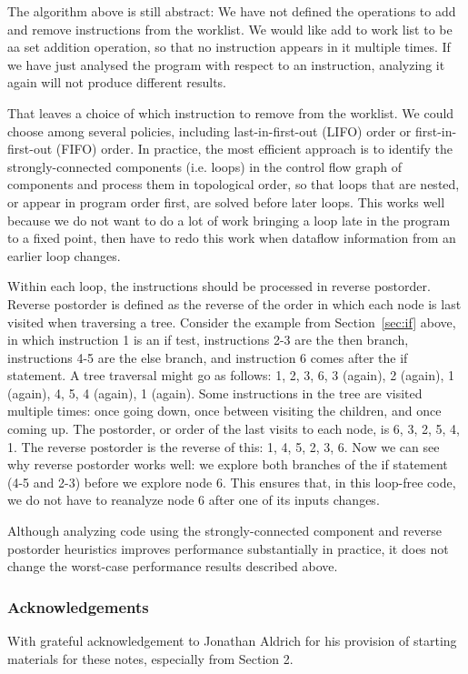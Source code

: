 \documentclass[11pt]{article}
\begin{document}
The algorithm above is still abstract: We have not defined the operations to add
and remove instructions from the worklist.  We would like add to work list to be
aa set addition operation, so that no instruction appears in it multiple times.
If we have just analysed the program with respect to an instruction, analyzing
it again will not produce different results.

That leaves a choice of which instruction to remove from the worklist.  We could
choose among several policies, including last-in-first-out (LIFO) order or
first-in-first-out (FIFO) order.  In practice, the most efficient approach is to
identify the strongly-connected components (i.e. loops) in the control flow
graph of components and process them in topological order, so that loops that
are nested, or appear in program order first, are solved before later loops.
This works well because we do not want to do a lot of work bringing a loop late
in the program to a fixed point, then have to redo this work when dataflow
information from an earlier loop changes.

Within each loop, the instructions should be processed in reverse postorder.
Reverse postorder is defined as the reverse of the order in which each node is
last visited when traversing a tree.  Consider the example from
Section~\ref{sec:if} above, in which instruction 1 is an if test, instructions
2-3 are the then branch, instructions 4-5 are the else branch, and instruction 6
comes after the if statement.  A tree traversal might go as follows: 1, 2, 3, 6,
3 (again), 2 (again), 1 (again), 4, 5, 4 (again), 1 (again).  Some instructions
in the tree are visited multiple times: once going down, once between visiting
the children, and once coming up.  The postorder, or order of the last visits to
each node, is 6, 3, 2, 5, 4, 1.  The reverse postorder is the reverse of this:
1, 4, 5, 2, 3, 6.  Now we can see why reverse postorder works well: we explore
both branches of the if statement (4-5 and 2-3) before we explore node 6.  This
ensures that, in this loop-free code, we do not have to reanalyze node 6 after
one of its inputs changes.

Although analyzing code using the strongly-connected component and reverse
postorder heuristics improves performance substantially in practice, it does not
change the worst-case performance results described above.


\subsubsection*{Acknowledgements}

With grateful acknowledgement to Jonathan Aldrich for his provision of starting
materials for these notes, especially from Section 2. 
\end{document}
